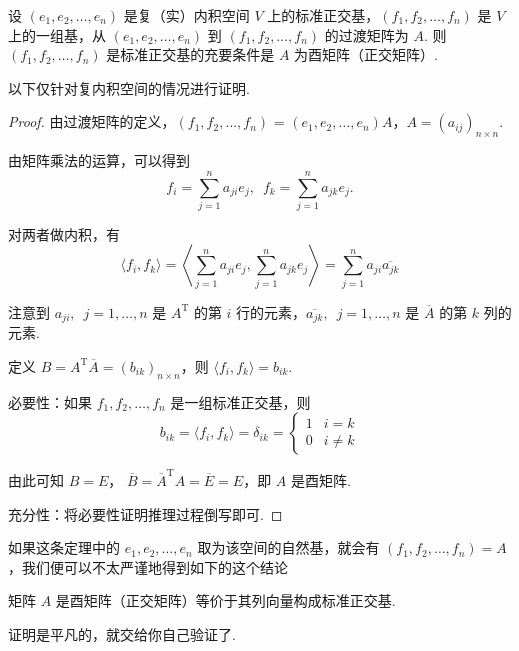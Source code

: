 \begin{theorem}
    设 $ (e_1, e_2, \ldots , e_n) $ 是复（实）内积空间 $ V $ 上的标准正交基，$ (f_1, f_2, \ldots , f_n) $ 是 $ V $ 上的一组基，从 $ (e_1, e_2, \ldots , e_n) $ 到 $ (f_1, f_2, \ldots , f_n) $ 的过渡矩阵为 $ A $. 则 $ (f_1, f_2, \ldots , f_n) $ 是标准正交基的充要条件是 $ A $ 为酉矩阵（正交矩阵）.
\end{theorem}

以下仅针对复内积空间的情况进行证明.

\begin{proof}
    由过渡矩阵的定义，$ (f_1, f_2, \ldots , f_n) $ = $ (e_1, e_2, \ldots , e_n)A $，$ A = (a_{ij})_{n \times n} $.

    由矩阵乘法的运算，可以得到
    \[ f_i = \sum_{j = 1}^{n} a_{ji}e_j , \enspace f_k = \sum_{j = 1}^{n} a_{jk}e_j. \]

    对两者做内积，有
    \[ \langle f_i, f_k \rangle = \left\langle \sum_{j = 1}^{n} a_{ji}e_j, \sum_{j = 1}^{n} a_{jk}e_j \right\rangle = \sum_{j = 1}^{n} a_{ji}\overline{a_{jk}} \]

    注意到 $ a_{ji},\enspace j = 1, \ldots , n $ 是 $ A^{\mathrm{T}} $ 的第 $ i $ 行的元素，$ \overline{a_{jk}},\enspace j = 1, \ldots , n $ 是 $ \overline{A} $ 的第 $ k $ 列的元素.

    定义 $ B = A^{\mathrm{T}}\overline{A} = (b_{ik})_{n \times n} $，则 $ \langle f_i, f_k \rangle = b_{ik} $.

    必要性：如果 $ f_1, f_2, \ldots , f_n $ 是一组标准正交基，则
    \[b_{ik} = \langle f_i, f_k \rangle = \delta_{ik} =
        \begin{cases}
            1 & i = k    \\
            0 & i \neq k
        \end{cases}\]

    由此可知 $ B = E $， $ \overline{B} = \overline{A}^{\mathrm{T}} A = \overline{E} = E $，即 $ A $ 是酉矩阵.

    充分性：将必要性证明推理过程倒写即可.
\end{proof}

如果这条定理中的 $ e_1, e_2, \ldots , e_n $ 取为该空间的自然基，就会有 $ (f_1, f_2, \ldots , f_n) = A $，我们便可以不太严谨地得到如下的这个结论

\begin{theorem}
    矩阵 $ A $ 是酉矩阵（正交矩阵）等价于其列向量构成标准正交基.
\end{theorem}

证明是平凡的，就交给你自己验证了.

